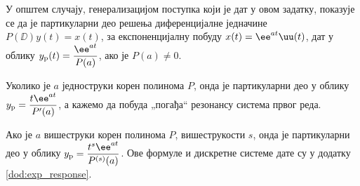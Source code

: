У општем случају, генерализацијом поступка који је дат у овом задатку, показује 
се да је партикуларни део решења диференцијалне једначине 
$P(\DD) y(t) = x(t)$, за експоненцијалну побуду $x(t) = \ee^{at} \uu(t)$, дат 
у облику $y_{\rm p}(t) = \dfrac{\ee^{at}}{P(a)}$, ако је $P(a) \neq 0$.

Уколико је $a$ једноструки корен полинома $P$, онда је партикуларни део у облику
$y_{\rm p} = \dfrac{t \ee^{at}}{P'(a)}$, а кажемо да побуда „погађа“ резонансу система 
првог реда. 

Ако је $a$ вишеструки корен полинома $P$, вишеструкости $s$, 
онда је партикуларни део у облику $ y_{\rm p} = \dfrac{t^s \ee^{at}}{P^{(s)}(a)}$. Ове формуле 
и дискретне системе дате су у додатку \ref{dod:exp_response}.
